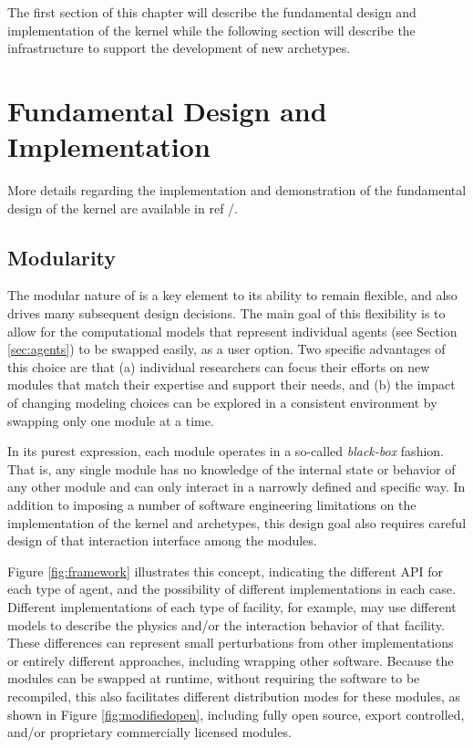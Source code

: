 The first section of this chapter will describe the fundamental design and
implementation of the \Cyclus kernel while the following section will describe
the infrastructure to support the development of new archetypes.

\section{Fundamental Design and Implementation} %

More details regarding the implementation and demonstration of the fundamental
design of the \Cyclus kernel are available in ref
/.

\subsection{Modularity}

The modular nature of \Cyclus is a key element to its ability to remain
flexible, and also drives many subsequent design decisions.  The main goal of
this flexibility is to allow for the computational models that represent
individual agents (see Section \ref{sec:agents}) to be swapped easily, as a
user option.  Two specific advantages of this choice are that (a) individual
researchers can focus their efforts on new modules that match their expertise
and support their needs, and (b) the impact of changing modeling choices can
be explored in a consistent environment by swapping only one module at a time.

In its purest expression, each module operates in a so-called
\textit{black-box} fashion.  That is, any single module has no knowledge of
the internal state or behavior of any other module and can only interact in a
narrowly defined and specific way.  In addition to imposing a number of
software engineering limitations on the implementation of the kernel and
archetypes, this design goal also requires careful design of that interaction
interface among the modules.

Figure \ref{fig:framework} illustrates this concept, indicating the different
\gls{API} for each type of agent, and the possibility of different
implementations in each case.  Different implementations of each type of
facility, for example, may use different models to describe the physics and/or
the interaction behavior of that facility.  These differences can represent
small perturbations from other implementations or entirely different
approaches, including wrapping other software.  Because the modules can be
swapped at runtime, without requiring the software to be recompiled, this also
facilitates different distribution modes for these modules, as shown in Figure
\ref{fig:modifiedopen}, including fully open source, export controlled, and/or
proprietary commercially licensed modules.

